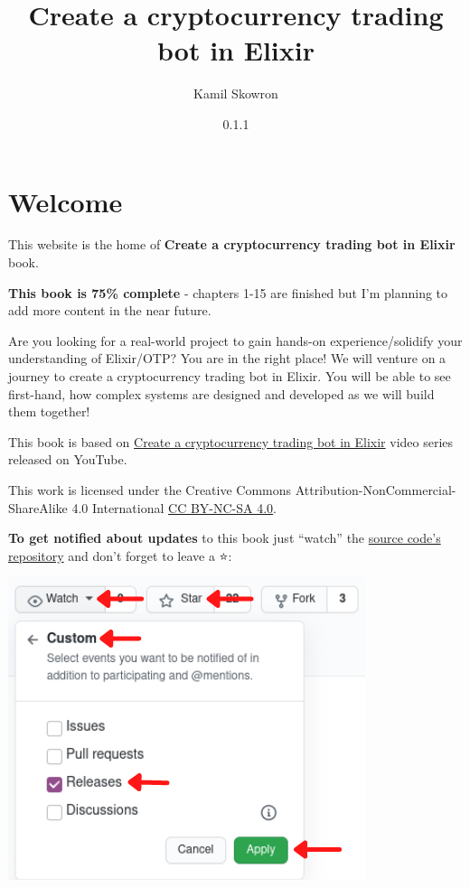 \documentclass[
  oneside]{book}
\title{Create a cryptocurrency trading bot in Elixir}
\author{Kamil Skowron}
\date{0.1.1}
\begin{document}
\maketitle

{
\setcounter{tocdepth}{1}
\tableofcontents
}
\hypertarget{welcome}{%
\chapter*{Welcome 👋}\label{welcome}}

This website is the home of \textbf{Create a cryptocurrency trading bot in Elixir} book.

\textbf{This book is 75\% complete} - chapters 1-15 are finished but I'm planning to add more content in the near future.

Are you looking for a real-world project to gain hands-on experience/solidify your understanding of Elixir/OTP? You are in the right place! We will venture on a journey to create a cryptocurrency trading bot in Elixir. You will be able to see first-hand, how complex systems are designed and developed as we will build them together!

This book is based on \href{https://www.youtube.com/watch?v=wVYIx7M6o28\&list=PLxsE19GnjC5Nv1CbeKOiS5YqGqw35aZFJ}{Create a cryptocurrency trading bot in Elixir} video series released on YouTube.

This work is licensed under the Creative Commons Attribution-NonCommercial-ShareAlike 4.0 International \href{https://creativecommons.org/licenses/by-nc-sa/4.0/}{CC BY-NC-SA 4.0}.

\textbf{To get notified about updates} to this book just ``watch'' the \href{https://github.com/frathon/create-a-cryptocurrency-trading-bot-in-elixir}{source code's repository} and don't forget to leave a ⭐:

\includegraphics{images/watch_book_howto.png}
\end{document}
